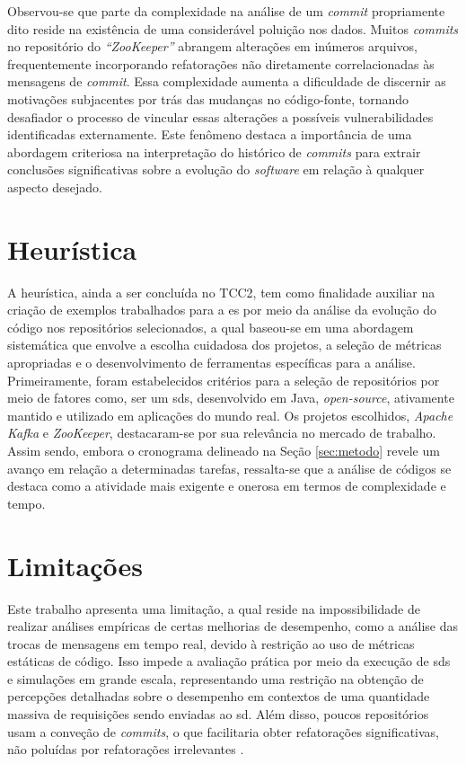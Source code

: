 
Observou-se que parte da complexidade na análise de um \textit{commit} propriamente dito reside na existência de uma considerável poluição nos dados. Muitos \textit{commits} no repositório do \textit{``ZooKeeper''} abrangem alterações em inúmeros arquivos, frequentemente incorporando refatorações não diretamente correlacionadas às mensagens de \textit{commit}. Essa complexidade aumenta a dificuldade de discernir as motivações subjacentes por trás das mudanças no código-fonte, tornando desafiador o processo de vincular essas alterações a possíveis vulnerabilidades identificadas externamente. Este fenômeno destaca a importância de uma abordagem criteriosa na interpretação do histórico de \textit{commits} para extrair conclusões significativas sobre a evolução do \textit{software} em relação à qualquer aspecto desejado.

\section{Heurística}
\label{sec:heuristica}

A heurística, ainda a ser concluída no TCC2, tem como finalidade auxiliar na criação de exemplos trabalhados para a \gls{es} por meio da análise da evolução do código nos repositórios selecionados, a qual baseou-se em uma abordagem sistemática que envolve a escolha cuidadosa dos projetos, a seleção de métricas apropriadas e o desenvolvimento de ferramentas específicas para a análise. Primeiramente, foram estabelecidos critérios para a seleção de repositórios por meio de fatores como, ser um \gls{sds}, desenvolvido em Java, \textit{open-source}, ativamente mantido e utilizado em aplicações do mundo real. Os projetos escolhidos, \textit{Apache Kafka} e \textit{ZooKeeper}, destacaram-se por sua relevância no mercado de trabalho. Assim sendo, embora o cronograma delineado na Seção \ref{sec:metodo} revele um avanço em relação a determinadas tarefas, ressalta-se que a análise de códigos se destaca como a atividade mais exigente e onerosa em termos de complexidade e tempo.

\section{Limitações}
\label{sec:limitacoes}

Este trabalho apresenta uma limitação, a qual reside na impossibilidade de realizar análises empíricas de certas melhorias de desempenho, como a análise das trocas de mensagens em tempo real, devido à restrição ao uso de métricas estáticas de código. Isso impede a avaliação prática por meio da execução de \gls{sds} e simulações em grande escala, representando uma restrição na obtenção de percepções detalhadas sobre o desempenho em contextos de uma quantidade massiva de requisições sendo enviadas ao \gls{sd}. Além disso, poucos repositórios usam a conveção de \textit{commits}, o que facilitaria obter refatorações significativas, não poluídas por refatorações irrelevantes \cite{conventionalcommits}.
